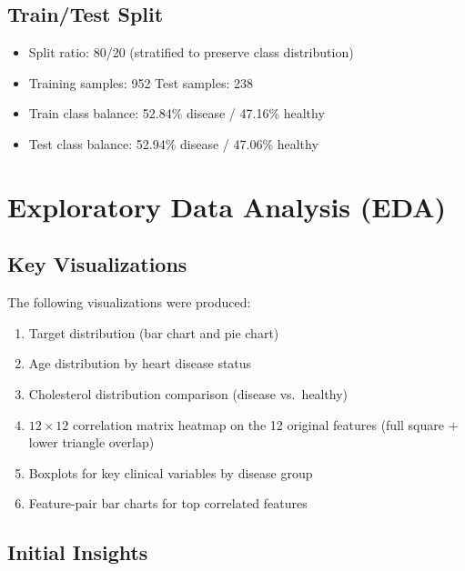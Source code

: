 \documentclass[12pt,a4paper]{article}
\begin{document}
\subsection{Train/Test Split}

\begin{itemize}
    \item Split ratio: 80/20 (stratified to preserve class distribution)
    \item Training samples: 952 \quad Test samples: 238
    \item Train class balance: 52.84\% disease / 47.16\% healthy
    \item Test class balance: 52.94\% disease / 47.06\% healthy
\end{itemize}

\section{Exploratory Data Analysis (EDA)}

\subsection{Key Visualizations}

The following visualizations were produced:

\begin{enumerate}
    \item Target distribution (bar chart and pie chart)
    \item Age distribution by heart disease status
    \item Cholesterol distribution comparison (disease vs.\ healthy)
    \item $12 \times 12$ correlation matrix heatmap on the 12 original features (full square + lower triangle overlap)
    \item Boxplots for key clinical variables by disease group
    \item Feature-pair bar charts for top correlated features
\end{enumerate}

\subsection{Initial Insights}
\end{document}
